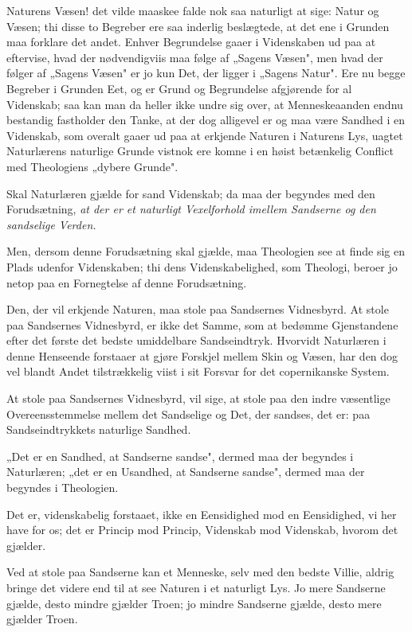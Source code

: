 \documentclass[12pt,a4paper]{article}
\newcommand{\opage}[1]{\marginnote{\footnotesize\textit{[#1]}}}
\begin{document}
Naturens Væsen! det vilde maaskee falde nok saa naturligt at sige: Natur og
Væsen; thi disse to Begreber ere saa inderlig beslægtede, at det ene i Grunden
maa forklare det andet. Enhver Begrundelse gaaer i Videnskaben ud paa at
eftervise, hvad der nødvendigviis maa følge af „Sagens Væsen", men hvad der følger
af „Sagens Væsen" er jo kun Det, der ligger i „Sagens Natur".
\opage{31} Ere nu begge Begreber i Grunden Eet, og er Grund og Begrundelse afgjørende for
al Videnskab; saa kan man da heller ikke undre sig over, at Menneskeaanden endnu
bestandig fastholder den Tanke, at der dog alligevel er og maa være Sandhed i en
Videnskab, som overalt gaaer ud paa at erkjende Naturen i Naturens Lys, uagtet
Naturlærens naturlige Grunde vistnok ere komne i en høist betænkelig Conflict med
Theologiens „dybere Grunde".

Skal Naturlæren gjælde for sand Videnskab; da maa der begyndes med den
Forudsætning, \emph{at der er et naturligt Vexelforhold imellem Sandserne og den
sandselige Verden.}

Men, dersom denne Forudsætning skal gjælde, maa Theologien see at finde sig en
Plads udenfor Videnskaben; thi dens Videnskabelighed, som Theologi, beroer jo
netop paa en Fornegtelse af denne Forudsætning.

Den, der vil erkjende Naturen, maa stole paa Sandsernes Vidnesbyrd. At stole paa
Sandsernes Vidnesbyrd, er ikke det Samme, som at bedømme Gjenstandene efter det
første det bedste umiddelbare Sandseindtryk. Hvorvidt Naturlæren i denne
Henseende forstaaer at gjøre Forskjel mellem Skin og Væsen, har den dog vel
blandt Andet tilstrækkelig viist i sit Forsvar for det copernikanske System.

At stole paa Sandsernes Vidnesbyrd, vil sige, at stole paa den indre væsentlige
Overeensstemmelse mellem det Sandselige og Det, der sandses, det er: paa
Sandseindtrykkets naturlige Sandhed.

„Det er en Sandhed, at Sandserne sandse", dermed maa der begyndes i Naturlæren;
„det er en Usandhed, at Sandserne sandse", dermed maa der begyndes i Theologien.

Det er, videnskabelig forstaaet, ikke en Eensidighed mod en Eensidighed, vi her
have for os; det er Princip mod Princip, Videnskab mod Videnskab, hvorom det
gjælder.

Ved at stole paa Sandserne kan et Menneske, selv med den bedste Villie, aldrig
bringe det videre end til at see Naturen i et naturligt Lys.
\opage{32} Jo mere Sandserne gjælde, desto mindre gjælder Troen; jo mindre Sandserne
gjælde, desto mere gjælder Troen.
\end{document}
